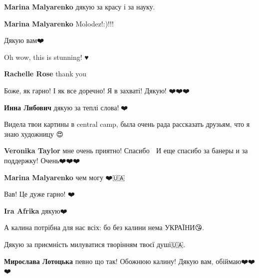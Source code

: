 \begin{itemize} %
\textbf{Marina Malyarenko} дякую за красу і за науку.

\textbf{Marina Malyarenko} Molodez!:)!!!


Дякую вам❤️
\end{itemize} %


Oh wow, this is stunning! ♥️🐝🌺

\begin{itemize} %
\textbf{Rachelle Rose} thank you 💛
\end{itemize} %


Боже, як гарно! І як все доречно! Я в захваті! Дякую! ❤️❤️❤️

\begin{itemize} %
\textbf{Инна Либович} дякую за теплі слова!🙏❤️
\end{itemize} %


Видела твои картины в central camp, была очень рада рассказать друзьям, что я
знаю художницу 😍

\begin{itemize} %
\textbf{Veronika Taylor} мне очень приятно! Спасибо 🥰
И еще спасибо за банеры и за поддержку! Очень❤️❤️❤️

\textbf{Marina Malyarenko} чем могу ❤️🇺🇦
\end{itemize} %


Вав! Це дуже гарно! ❤️

\begin{itemize} %
\textbf{Ira Afrika} дякую❤️
\end{itemize} %


А калина потрібна для нас всіх: бо без калини нема УКРАЇНИ😘.

Дякую за приємність милуватися творінням твоєї душі🇺🇦.

\begin{itemize} %
\textbf{Мирослава Лотоцька} певно що так! Обожнюю калину! Дякую вам, обіймаю❤️❤️❤️
\end{itemize} %

